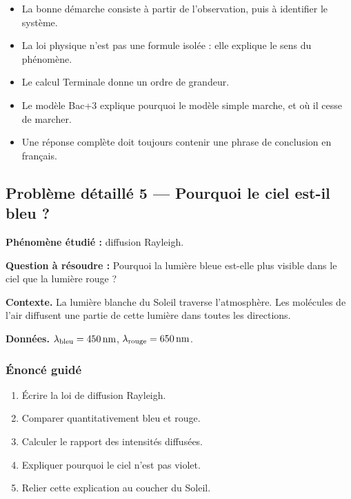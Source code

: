 \documentclass[11pt,a4paper]{article}
\begin{document}
\begin{methodebox}
\begin{itemize}
  \item La bonne démarche consiste à partir de l'observation, puis à identifier le système.
  \item La loi physique n'est pas une formule isolée : elle explique le sens du phénomène.
  \item Le calcul Terminale donne un ordre de grandeur.
  \item Le modèle Bac+3 explique pourquoi le modèle simple marche, et où il cesse de marcher.
  \item Une réponse complète doit toujours contenir une phrase de conclusion en français.
\end{itemize}
\end{methodebox}

\subsection{Problème détaillé 5 — Pourquoi le ciel est-il bleu ?}

\begin{exercicebox}
\textbf{Phénomène étudié :} diffusion Rayleigh.

\medskip
\textbf{Question à résoudre :} Pourquoi la lumière bleue est-elle plus visible dans le ciel que la lumière rouge ?

\medskip
\textbf{Contexte.} La lumière blanche du Soleil traverse l'atmosphère. Les molécules de l'air diffusent une partie de cette lumière dans toutes les directions.

\medskip
\textbf{Données.} \(\lambda_{\rm bleu}=450\,\mathrm{nm}\), \(\lambda_{\rm rouge}=650\,\mathrm{nm}\).
\end{exercicebox}

\subsubsection*{Énoncé guidé}

\begin{enumerate}
  \item Écrire la loi de diffusion Rayleigh.
  \item Comparer quantitativement bleu et rouge.
  \item Calculer le rapport des intensités diffusées.
  \item Expliquer pourquoi le ciel n'est pas violet.
  \item Relier cette explication au coucher du Soleil.
\end{enumerate}
\end{document}

